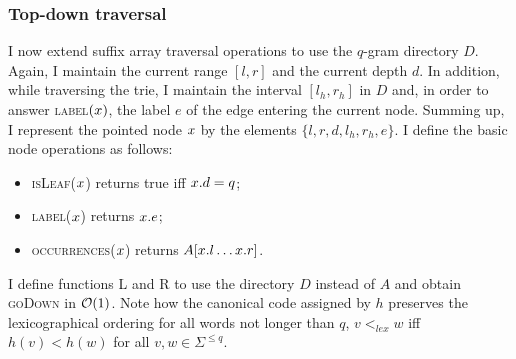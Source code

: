 \subsubsection{Top-down traversal}

I now extend suffix array traversal operations to use the $q$-gram directory $D$.
Again, I maintain the current range $[l,r]$ and the current depth $d$.
In addition, while traversing the trie, I maintain the interval $[l_h,r_h]$ in $D$ and, in order to answer \textsc{label}$(x)$, the label $e$ of the edge entering the current node.
Summing up, I represent the pointed node $x$ by the elements $\{ l, r, d, l_h, r_h, e \}$.
I define the basic node operations as follows:
\begin{itemize}
\item \textsc{isLeaf}($x$) returns true iff $x.d=q$;
\item \textsc{label}($x$) returns $x.e$;
\item \textsc{occurrences}($x$) returns $A[x.l \dots x.r]$.
\end{itemize}

I define functions \textsc{L} and \textsc{R} to use the directory $D$ instead of $A$ and obtain \textsc{goDown} in $\mathcal{O}(1)$.
Note how the canonical code assigned by $h$ preserves the lexicographical ordering for all words not longer than $q$, \ie $v <_{lex} w$ iff $h(v) < h(w)$ for all $v,w \in \Sigma^{\leq q}$.

